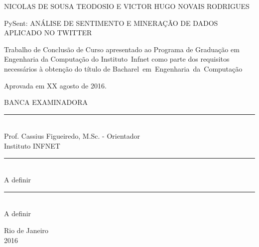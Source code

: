 %



\cleardoublepage
\thispagestyle{empty}

\vspace{-60mm}

\begin{center}
   {\large NICOLAS DE SOUSA TEODOSIO E VICTOR HUGO NOVAIS RODRIGUES}\\
   \vspace{7mm}

  PySent: ANÁLISE DE SENTIMENTO E MINERAÇÃO DE DADOS APLICADO NO TWITTER\\
 \vspace{8mm}  %
\end{center}

\noindent
\begin{flushright}
\begin{minipage}[t]{8cm} 

Trabalho de Conclusão de Curso apresentado ao Programa de Graduação em Engenharia da Computação do \mbox{Instituto Infnet} como parte dos requisitos
necessários à obtenção do título de \mbox{Bacharel em Engenharia da Computação}

\end{minipage}
\end{flushright}
\vspace{ 5mm}  %
\noindent
Aprovada em XX agosto de 2016. \\
\begin{flushright}
  \parbox{15cm}
  {
  \begin{center}
  BANCA EXAMINADORA \\
  \vspace{5mm}
  \rule{11cm}{.1mm} \\
	Prof. Cassius Figueiredo, M.Sc. - Orientador \\ 
	Instituto INFNET \\
  \vspace{5mm}
  \rule{11cm}{.1mm} \\
    A definir \\ 
  \vspace{5mm}
  \rule{11cm}{.1mm} \\
    A definir \\ 
  \end{center}
  }
\end{flushright}
\begin{center}
  \vspace{4mm} %
 Rio de Janeiro \\
  2016
\end{center}

